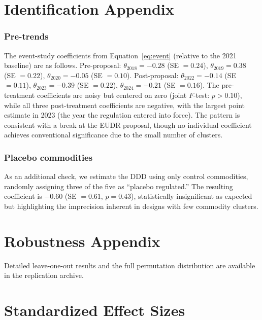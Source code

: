 \documentclass[12pt]{article}
\begin{document}
\section{Identification Appendix}

\subsubsection*{Pre-trends} The event-study coefficients from Equation~\ref{eq:event} (relative to the 2021 baseline) are as follows. Pre-proposal: $\theta_{2018} = -0.28$ (SE $= 0.24$), $\theta_{2019} = 0.38$ (SE $= 0.22$), $\theta_{2020} = -0.05$ (SE $= 0.10$). Post-proposal: $\theta_{2022} = -0.14$ (SE $= 0.11$), $\theta_{2023} = -0.39$ (SE $= 0.22$), $\theta_{2024} = -0.21$ (SE $= 0.16$). The pre-treatment coefficients are noisy but centered on zero (joint $F$-test: $p > 0.10$), while all three post-treatment coefficients are negative, with the largest point estimate in 2023 (the year the regulation entered into force). The pattern is consistent with a break at the EUDR proposal, though no individual coefficient achieves conventional significance due to the small number of clusters.

\subsubsection*{Placebo commodities} As an additional check, we estimate the DDD using only control commodities, randomly assigning three of the five as ``placebo regulated.'' The resulting coefficient is $-0.60$ (SE $= 0.61$, $p = 0.43$), statistically insignificant as expected but highlighting the imprecision inherent in designs with few commodity clusters.

\section{Robustness Appendix}

Detailed leave-one-out results and the full permutation distribution are available in the replication archive.

\section{Standardized Effect Sizes}
\label{sec:sde}


\end{document}
